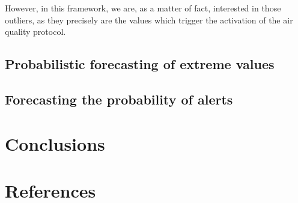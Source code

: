 \documentclass[a4paper,twocolumn,5p]{elsarticle}
\begin{document}
However, in this framework, we are, as a matter of fact, interested in
those outliers, as they precisely are the values which trigger the
activation of the air quality protocol.


\subsection{Probabilistic forecasting of extreme values}
\label{sec:probabilistic}


\subsection{Forecasting the probability of alerts}
\label{sec:alertProb2}


\section{Conclusions}
\label{sec:concl}


\section*{References}


\end{document}
